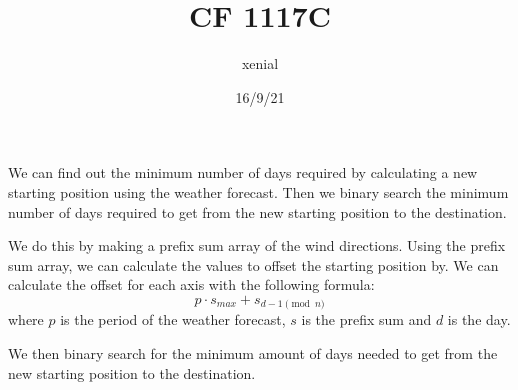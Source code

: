 \documentclass{article}
\title{CF 1117C}
\author{xenial}
\date{16/9/21}
\begin{document}
    \maketitle
    We can find out the minimum number of days required by calculating a new starting position using the weather forecast. Then we binary search the minimum number of days required to get from the new starting position to the destination.
    
    We do this by making a prefix sum array of the wind directions. 
    Using the prefix sum array, we can calculate the values to offset the starting position by.
    We can calculate the offset for each axis with the following formula: \[p \cdot s_{max} + s_{d - 1 \pmod n}\]
    where $p$ is the period of the weather forecast, $s$ is the prefix sum and $d$ is the day. 
    
    We then binary search for the minimum amount of days needed to get from the new starting position to the destination.
\end{document}
